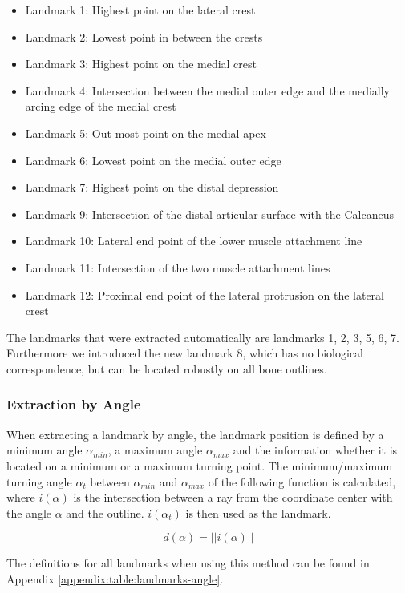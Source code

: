 \documentclass[pdftex,12pt,a4paper]{report}
\begin{document}
\begin{itemize}
\item Landmark 1: Highest point on the lateral crest
\item Landmark 2: Lowest point in between the crests
\item Landmark 3: Highest point on the medial crest
\item Landmark 4: Intersection between the medial outer edge and the medially arcing edge of the medial crest
\item Landmark 5: Out most point on the medial apex
\item Landmark 6: Lowest point on the medial outer edge
\item Landmark 7: Highest point on the distal depression
\item Landmark 9: Intersection of the distal articular surface with the Calcaneus
\item Landmark 10: Lateral end point of the lower muscle attachment line
\item Landmark 11: Intersection of the two muscle attachment lines
\item Landmark 12: Proximal end point of the lateral protrusion on the lateral crest
\end{itemize}

The landmarks that were extracted automatically are landmarks 1, 2, 3, 5, 6, 7. Furthermore we introduced the new
landmark 8, which has no biological correspondence, but can be located robustly on all bone outlines.

\subsubsection{Extraction by Angle}

When extracting a landmark by angle, the landmark position is defined by a minimum angle $\alpha_{min}$, a maximum
angle $\alpha_{max}$ and the information whether it is located on a minimum or a maximum turning point.
The minimum/maximum turning angle $\alpha_{t}$ between $\alpha_{min}$ and $\alpha_{max}$ of the following function
is calculated, where $i(\alpha)$ is the intersection between a ray from the coordinate center with the angle $\alpha$ and
the outline. $i(\alpha_t)$ is then used as the landmark.

\begin{equation}
d(\alpha) = ||i(\alpha)||
\end{equation}

The definitions for all landmarks when using this method can be found in Appendix \ref{appendix:table:landmarks-angle}.
\end{document}

